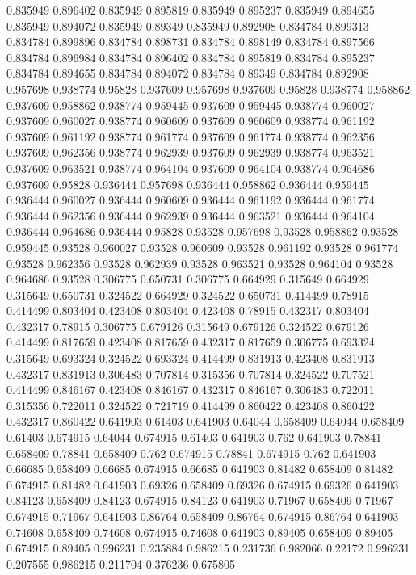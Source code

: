 0.835949 0.896402
0.835949 0.895819
0.835949 0.895237
0.835949 0.894655
0.835949 0.894072
0.835949 0.89349
0.835949 0.892908
0.834784 0.899313
0.834784 0.899896
0.834784 0.898731
0.834784 0.898149
0.834784 0.897566
0.834784 0.896984
0.834784 0.896402
0.834784 0.895819
0.834784 0.895237
0.834784 0.894655
0.834784 0.894072
0.834784 0.89349
0.834784 0.892908
0.957698 0.938774
0.95828 0.937609
0.957698 0.937609
0.95828 0.938774
0.958862 0.937609
0.958862 0.938774
0.959445 0.937609
0.959445 0.938774
0.960027 0.937609
0.960027 0.938774
0.960609 0.937609
0.960609 0.938774
0.961192 0.937609
0.961192 0.938774
0.961774 0.937609
0.961774 0.938774
0.962356 0.937609
0.962356 0.938774
0.962939 0.937609
0.962939 0.938774
0.963521 0.937609
0.963521 0.938774
0.964104 0.937609
0.964104 0.938774
0.964686 0.937609
0.95828 0.936444
0.957698 0.936444
0.958862 0.936444
0.959445 0.936444
0.960027 0.936444
0.960609 0.936444
0.961192 0.936444
0.961774 0.936444
0.962356 0.936444
0.962939 0.936444
0.963521 0.936444
0.964104 0.936444
0.964686 0.936444
0.95828 0.93528
0.957698 0.93528
0.958862 0.93528
0.959445 0.93528
0.960027 0.93528
0.960609 0.93528
0.961192 0.93528
0.961774 0.93528
0.962356 0.93528
0.962939 0.93528
0.963521 0.93528
0.964104 0.93528
0.964686 0.93528
0.306775 0.650731
0.306775 0.664929
0.315649 0.664929
0.315649 0.650731
0.324522 0.664929
0.324522 0.650731
0.414499 0.78915
0.414499 0.803404
0.423408 0.803404
0.423408 0.78915
0.432317 0.803404
0.432317 0.78915
0.306775 0.679126
0.315649 0.679126
0.324522 0.679126
0.414499 0.817659
0.423408 0.817659
0.432317 0.817659
0.306775 0.693324
0.315649 0.693324
0.324522 0.693324
0.414499 0.831913
0.423408 0.831913
0.432317 0.831913
0.306483 0.707814
0.315356 0.707814
0.324522 0.707521
0.414499 0.846167
0.423408 0.846167
0.432317 0.846167
0.306483 0.722011
0.315356 0.722011
0.324522 0.721719
0.414499 0.860422
0.423408 0.860422
0.432317 0.860422
0.641903 0.61403
0.641903 0.64044
0.658409 0.64044
0.658409 0.61403
0.674915 0.64044
0.674915 0.61403
0.641903 0.762
0.641903 0.78841
0.658409 0.78841
0.658409 0.762
0.674915 0.78841
0.674915 0.762
0.641903 0.66685
0.658409 0.66685
0.674915 0.66685
0.641903 0.81482
0.658409 0.81482
0.674915 0.81482
0.641903 0.69326
0.658409 0.69326
0.674915 0.69326
0.641903 0.84123
0.658409 0.84123
0.674915 0.84123
0.641903 0.71967
0.658409 0.71967
0.674915 0.71967
0.641903 0.86764
0.658409 0.86764
0.674915 0.86764
0.641903 0.74608
0.658409 0.74608
0.674915 0.74608
0.641903 0.89405
0.658409 0.89405
0.674915 0.89405
0.996231 0.235884
0.986215 0.231736
0.982066 0.22172
0.996231 0.207555
0.986215 0.211704
0.376236 0.675805
